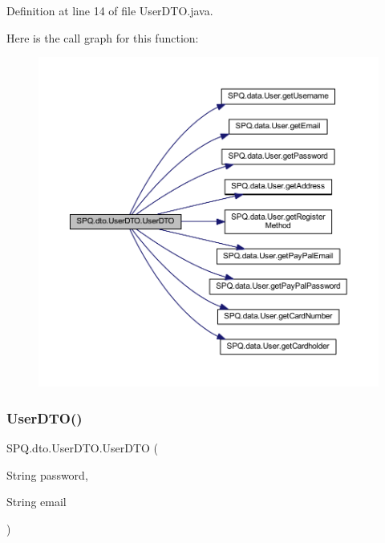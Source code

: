 Definition at line 14 of file User\+D\+T\+O.\+java.

Here is the call graph for this function\+:
\nopagebreak
\begin{figure}[H]
\begin{center}
\leavevmode
\includegraphics[width=350pt]{class_s_p_q_1_1dto_1_1_user_d_t_o_a40cad7b1dea2117ed4cb0e69fdc6b929_cgraph}
\end{center}
\end{figure}
\mbox{\label{class_s_p_q_1_1dto_1_1_user_d_t_o_a985590805ac057d894623b83b1042e29}} 
\subsubsection{\texorpdfstring{User\+D\+T\+O()}{UserDTO()}\hspace{0.1cm}{\footnotesize\ttfamily [5/11]}}
{\footnotesize\ttfamily S\+P\+Q.\+dto.\+User\+D\+T\+O.\+User\+D\+TO (\begin{DoxyParamCaption}\item[{String}]{password,  }\item[{String}]{email }\end{DoxyParamCaption})}




